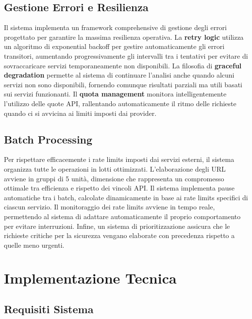 \documentclass{article}
\begin{document}
\subsection{Gestione Errori e Resilienza}

Il sistema implementa un framework comprehensive di gestione degli errori progettato per garantire la massima resilienza operativa. La \textbf{retry logic} utilizza un algoritmo di exponential backoff per gestire automaticamente gli errori transitori, aumentando progressivamente gli intervalli tra i tentativi per evitare di sovraccaricare servizi temporaneamente non disponibili.
\newline \newline
La filosofia di \textbf{graceful degradation} permette al sistema di continuare l'analisi anche quando alcuni servizi non sono disponibili, fornendo comunque risultati parziali ma utili basati sui servizi funzionanti. Il \textbf{quota management} monitora intelligentemente l'utilizzo delle quote API, rallentando automaticamente il ritmo delle richieste quando ci si avvicina ai limiti imposti dai provider.

\subsection{Batch Processing}

Per rispettare efficacemente i rate limits imposti dai servizi esterni, il sistema organizza tutte le operazioni in lotti ottimizzati. L'elaborazione degli URL avviene in gruppi di 5 unità, dimensione che rappresenta un compromesso ottimale tra efficienza e rispetto dei vincoli API. 
\newline \newline
Il sistema implementa pause automatiche tra i batch, calcolate dinamicamente in base ai rate limits specifici di ciascun servizio. Il monitoraggio dei rate limits avviene in tempo reale, permettendo al sistema di adattare automaticamente il proprio comportamento per evitare interruzioni. Infine, un sistema di prioritizzazione assicura che le richieste critiche per la sicurezza vengano elaborate con precedenza rispetto a quelle meno urgenti.
\newpage
\section{Implementazione Tecnica}

\subsection{Requisiti Sistema}
\end{document}
